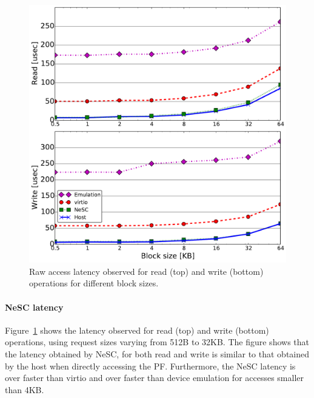 \begin{figure}[t]
  \centering
  \includegraphics[width=1\columnwidth]{figs/latency_block_size.pdf}
  \caption{Raw access latency observed for read (top) and write (bottom) operations for different block sizes.}
  \label{fig:latency}
\end{figure}

\paragraph{NeSC latency}
Figure~\ref{fig:latency} shows the latency observed for read (top) and write (bottom) operations, using request sizes varying from 512B to 32KB. The figure shows that the latency obtained by NeSC, for both read and write is similar to that obtained by the host when directly accessing the PF. Furthermore, the NeSC latency is  over  faster than virtio and over  faster than device emulation for accesses smaller than 4KB.

